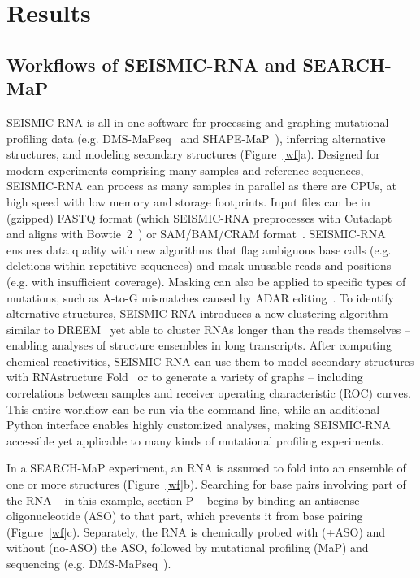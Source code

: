 \documentclass[main.tex]{subfiles}
\begin{document}
\section{Results}

\subsection{Workflows of SEISMIC-RNA and SEARCH-MaP}


SEISMIC-RNA is all-in-one software for processing and graphing mutational profiling data (e.g. DMS-MaPseq~\cite{Zubradt2016} and SHAPE-MaP~\cite{Siegfried2014}), inferring alternative structures, and modeling secondary structures (Figure~\ref{wf}a).
Designed for modern experiments comprising many samples and reference sequences, SEISMIC-RNA can process as many samples in parallel as there are CPUs, at high speed with low memory and storage footprints.
Input files can be in (gzipped) FASTQ format (which SEISMIC-RNA preprocesses with Cutadapt~\cite{Martin2011} and aligns with Bowtie~2~\cite{Langmead2012}) or SAM/BAM/CRAM format~\cite{Li2009}.
SEISMIC-RNA ensures data quality with new algorithms that flag ambiguous base calls (e.g. deletions within repetitive sequences) and mask unusable reads and positions (e.g. with insufficient coverage).
Masking can also be applied to specific types of mutations, such as A-to-G mismatches caused by ADAR editing~\cite{Roth2019}.
To identify alternative structures, SEISMIC-RNA introduces a new clustering algorithm -- similar to DREEM~\cite{Tomezsko} yet able to cluster RNAs longer than the reads themselves -- enabling analyses of structure ensembles in long transcripts.
After computing chemical reactivities, SEISMIC-RNA can use them to model secondary structures with RNAstructure Fold~\cite{Reuter2010,Cordero2012} or to generate a variety of graphs -- including correlations between samples and receiver operating characteristic (ROC) curves.
This entire workflow can be run via the command line, while an additional Python interface enables highly customized analyses, making SEISMIC-RNA accessible yet applicable to many kinds of mutational profiling experiments.

In a SEARCH-MaP experiment, an RNA is assumed to fold into an ensemble of one or more structures (Figure~\ref{wf}b).
Searching for base pairs involving part of the RNA -- in this example, section P -- begins by binding an antisense oligonucleotide (ASO) to that part, which prevents it from base pairing (Figure~\ref{wf}c).
Separately, the RNA is chemically probed with (+ASO) and without (no-ASO) the ASO, followed by mutational profiling (MaP) and sequencing (e.g. DMS-MaPseq~\cite{Zubradt2016}).
\end{document}
